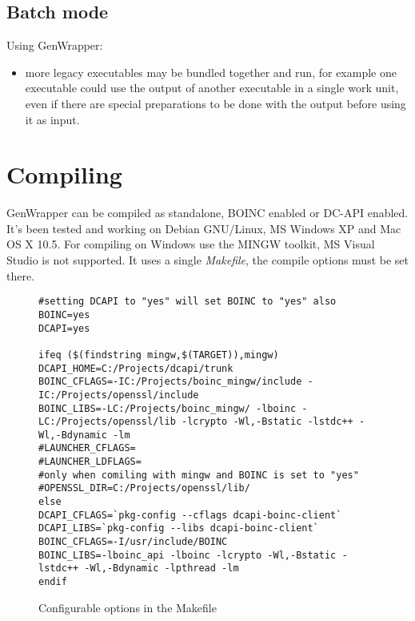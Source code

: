 \documentclass[a4paper,12pt,titlepage,dvipdfm]{article}
\begin{document}
\subsection{Batch mode}

Using GenWrapper:
\begin{itemize}
    \item more legacy executables may be bundled together and run, for example one executable could use the output of another executable in a single work unit, even if there are special preparations to be done with the output before using it as input.
\end{itemize}

\section{Compiling}

GenWrapper can be compiled as standalone, BOINC enabled or DC-API enabled. It's been tested and working on Debian GNU/Linux, MS Windows XP and Mac OS X 10.5. For compiling on Windows use the MINGW toolkit, MS Visual Studio is not supported. It uses a single \emph{Makefile}, the compile options must be set there. 

\lstset{
  breaklines=true,                                     %
  language=make,
  frame=trbl,
  framesep=5pt,
  basicstyle=\small,
  keywordstyle=\ttfamily,
  identifierstyle=\texttt,
  stringstyle=\ttfamily,
  linewidth=\textwidth,
  numbers=none
}

\begin{figure}[htb]
\begin{lstlisting}[breaklines=true]
#setting DCAPI to "yes" will set BOINC to "yes" also
BOINC=yes
DCAPI=yes

ifeq ($(findstring mingw,$(TARGET)),mingw)
DCAPI_HOME=C:/Projects/dcapi/trunk
BOINC_CFLAGS=-IC:/Projects/boinc_mingw/include -IC:/Projects/openssl/include
BOINC_LIBS=-LC:/Projects/boinc_mingw/ -lboinc -LC:/Projects/openssl/lib -lcrypto -Wl,-Bstatic -lstdc++ -Wl,-Bdynamic -lm
#LAUNCHER_CFLAGS=
#LAUNCHER_LDFLAGS=
#only when comiling with mingw and BOINC is set to "yes"
#OPENSSL_DIR=C:/Projects/openssl/lib/
else
DCAPI_CFLAGS=`pkg-config --cflags dcapi-boinc-client`
DCAPI_LIBS=`pkg-config --libs dcapi-boinc-client`
BOINC_CFLAGS=-I/usr/include/BOINC
BOINC_LIBS=-lboinc_api -lboinc -lcrypto -Wl,-Bstatic -lstdc++ -Wl,-Bdynamic -lpthread -lm
endif

\end{lstlisting}
\caption{Configurable options in the Makefile}\label{fig:makefile}
\end{figure}
\end{document}

